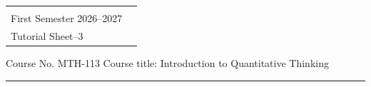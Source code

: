 \documentclass[a4paper,leqno,12pt]{amsart}
\begin{document}
\hspace*{1.9cm}%
\begin{tabular}{@{}p{}p{}@{}}
 {\raggedright
   \begin{center} 
   \textbf{AZIM PREMJI UNIVERSITY, BHOPAL}\\
   First Semester 2026--2027 \\
   Tutorial Sheet--3
   \end{center}
  } %
\end{tabular}


\noindent Course No. MTH-113 \hfill  Course title: Introduction to Quantitative Thinking
\vspace{.3cm}
\hrule 
\vspace{.3cm}
\end{document}
